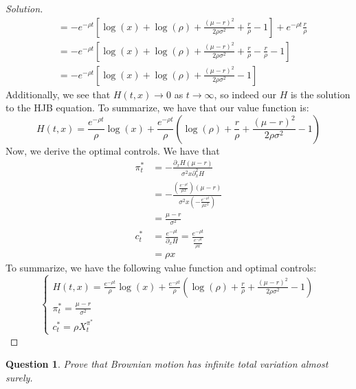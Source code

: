 \documentclass{amsart}
\newtheorem{theorem}{Question}
\begin{document}
\begin{proof}[Solution]
\begin{align*}
    &= -e^{-\rho t} \left[ \log(x) + \log(\rho) + \frac{(\mu - r)^2}{2\rho\sigma^2} + \frac{r}{\rho} - 1 \right] + e^{-\rho t} \frac{r}{\rho} \\
    &= -e^{-\rho t} \left[ \log(x) + \log(\rho) + \frac{(\mu - r)^2}{2\rho\sigma^2} + \frac{r}{\rho} - \frac{r}{\rho} - 1 \right] \\
    &= -e^{-\rho t} \left[ \log(x) + \log(\rho) + \frac{(\mu - r)^2}{2\rho\sigma^2} - 1 \right] 
    \end{align*}
    Additionally, we see that $H(t,x) \to 0$ as $t \to \infty$, so indeed our $H$ is the solution to the HJB equation.
    To summarize, we have that our value function is: 
    \[
    H(t, x) = \frac{e^{-\rho t}}{\rho} \log(x) + \frac{e^{-\rho t}}{\rho} \left(\log(\rho) + \frac{r}{\rho} + \frac{(\mu - r)^2}{2 \rho\sigma^2} - 1\right)
    \]
    Now, we derive the optimal controls. We have that
    \begin{align*}
    \pi_t^\ast &= -\frac{\partial_x H (\mu - r)}{\sigma^2 x \partial_x^2 H} \\
    &= -\frac{\left(\frac{e^{-\rho t}}{\rho x}\right) (\mu - r)}{\sigma^2 x \left(-\frac{e^{-\rho t}}{\rho x^2}\right)} \\
    &= \frac{\mu - r}{\sigma^2} \\
    c_t^\ast &= \frac{e^{-\rho t}}{\partial_x H} = \frac{e^{-\rho t}}{\frac{e^{-\rho t}}{\rho x}} \\
    &= \rho x
    \end{align*}
    To summarize, we have the following value function and optimal controls:
    \[
    \begin{cases}
    H(t, x) = \frac{e^{-\rho t}}{\rho} \log(x) + \frac{e^{-\rho t}}{\rho} \left(\log(\rho) + \frac{r}{\rho} + \frac{(\mu - r)^2}{2 \rho\sigma^2} - 1\right)\\
    \pi_t^\ast = \frac{\mu - r}{\sigma^2} \\
    c_t^\ast = \rho X_t^{\pi^\ast}
    \end{cases}
    \]
\end{proof}
\begin{theorem}
    Prove that Brownian motion has infinite total variation almost surely.
\end{theorem}
\end{document}
